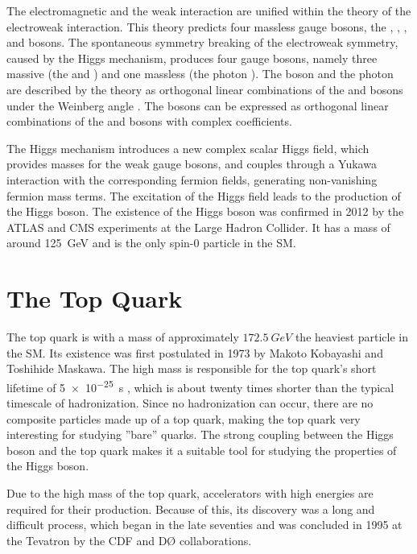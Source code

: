 The electromagnetic and the weak interaction are unified within the theory of the electroweak interaction. This theory predicts four massless gauge bosons, the \PBzero, \PWone, \PWtwo, and \PWthree bosons. The spontaneous symmetry breaking of the electroweak symmetry, caused by the Higgs mechanism, produces four gauge bosons, namely three massive (the \PZzero and \PWpm) and one massless (the photon \Pphoton). The \PZzero boson and the photon \Pphoton are described by the theory as orthogonal linear combinations of the \PBzero and \PWthree bosons under the Weinberg angle \cite{wiki:electroweak}. The \PWpm bosons can be expressed as orthogonal linear combinations of the \PWone and \PWtwo bosons with complex coefficients.

The Higgs mechanism introduces a new complex scalar Higgs field, which provides masses for the weak gauge bosons, and couples through a Yukawa interaction with the corresponding fermion fields, generating non-vanishing fermion mass terms. The excitation of the Higgs field leads to the production of the Higgs boson. The existence of the Higgs boson was confirmed in 2012 by the ATLAS and CMS experiments at the Large Hadron Collider. It has a mass of around \SI{125}{\giga\eV} \cite{Cha12} and is the only spin-0 particle in the SM.

\section{The Top Quark}
\label{sec:theory_top}
The top quark is with a mass of approximately $\SI{172.5}{GeV}$ \cite{ACCC14} the heaviest particle in the SM. Its existence was first postulated in 1973 by Makoto Kobayashi and Toshihide Maskawa. The high mass is responsible for the top quark's short lifetime of \SI{5e-25}{s} \cite{pdg}, which is about twenty times shorter than the typical timescale of hadronization. Since no hadronization can occur, there are no composite particles made up of a top quark, making the top quark very interesting for studying ''bare'' quarks. The strong coupling between the Higgs boson and the top quark makes it a suitable tool for studying the properties of the Higgs boson.

Due to the high mass of the top quark, accelerators with high energies are required for their production. Because of this, its discovery was a long and difficult process, which began in the late seventies \cite{RevModPhys.69.137} and was concluded in 1995 at the Tevatron by the CDF and D\O{} collaborations.

